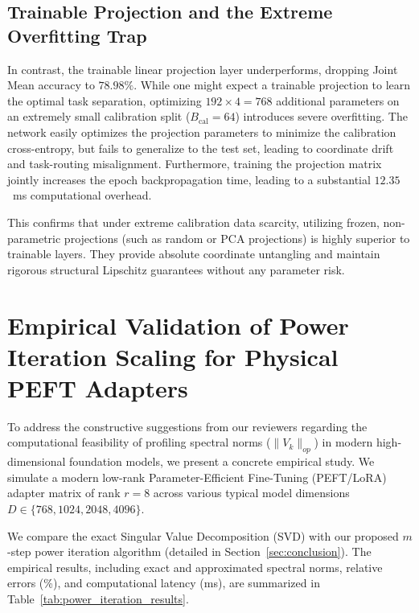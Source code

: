 \documentclass{article}
\theoremstyle{plain}
\theoremstyle{definition}
\theoremstyle{remark}
\begin{document}
\subsection{Trainable Projection and the Extreme Overfitting Trap}
In contrast, the trainable linear projection layer underperforms, dropping Joint Mean accuracy to $78.98\%$. While one might expect a trainable projection to learn the optimal task separation, optimizing $192 \times 4 = 768$ additional parameters on an extremely small calibration split ($B_{\text{cal}}=64$) introduces severe overfitting. The network easily optimizes the projection parameters to minimize the calibration cross-entropy, but fails to generalize to the test set, leading to coordinate drift and task-routing misalignment. Furthermore, training the projection matrix jointly increases the epoch backpropagation time, leading to a substantial $12.35$~ms computational overhead.

This confirms that under extreme calibration data scarcity, utilizing frozen, non-parametric projections (such as random or PCA projections) is highly superior to trainable layers. They provide absolute coordinate untangling and maintain rigorous structural Lipschitz guarantees without any parameter risk.

\section{Empirical Validation of Power Iteration Scaling for Physical PEFT Adapters}
\label{app:power_iteration}

To address the constructive suggestions from our reviewers regarding the computational feasibility of profiling spectral norms ($\|V_k\|_{op}$) in modern high-dimensional foundation models, we present a concrete empirical study. We simulate a modern low-rank Parameter-Efficient Fine-Tuning (PEFT/LoRA) adapter matrix of rank $r = 8$ across various typical model dimensions $D \in \{768, 1024, 2048, 4096\}$.

We compare the exact Singular Value Decomposition (SVD) with our proposed $m$-step power iteration algorithm (detailed in Section~\ref{sec:conclusion}). The empirical results, including exact and approximated spectral norms, relative errors (\%), and computational latency (ms), are summarized in Table~\ref{tab:power_iteration_results}.
\end{document}

